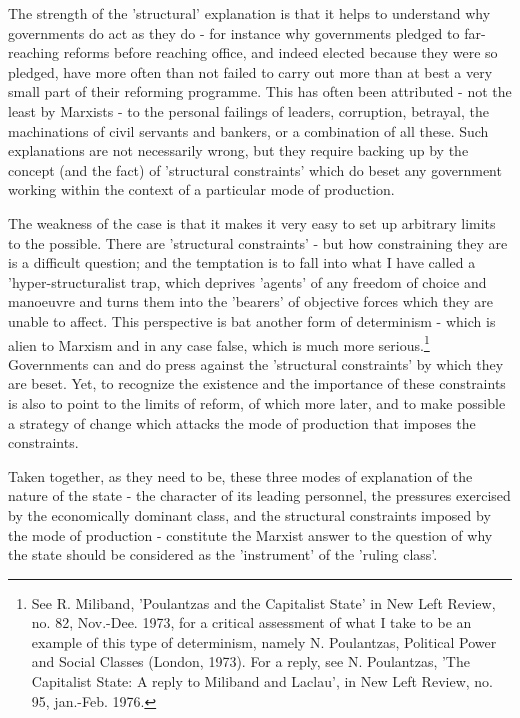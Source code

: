 The strength of the 'structural' explanation is that it helps to understand why governments do act as they do - for instance why governments pledged to far-reaching reforms before reaching office, and indeed elected because they were so pledged, have more often than not failed to carry out more than at best a very small part of their reforming programme. This has often been attributed - not the least by Marxists - to the personal failings of leaders, corruption, betrayal, the machinations of civil servants and bankers, or a combination of all these. Such explanations are not necessarily wrong, but they require backing up by the concept (and the fact) of 'structural constraints' which do beset any government working within the context of a particular mode of production.

The weakness of the case is that it makes it very easy to set up arbitrary limits to the possible. There are 'structural constraints' - but how constraining they are is a difficult question; and the temptation is to fall into what I have called a 'hyper\hyp{}structuralist trap, which deprives 'agents' of any freedom of choice and manoeuvre and turns them into the 'bearers' of objective forces which they are unable to affect. This perspective is bat another form of determinism - which is alien to Marxism and in any case false, which is much more serious.\footnote{See R. Miliband, 'Poulantzas and the Capitalist State' in New Left Review, no. 82, Nov.-Dee. 1973, for a critical assessment of what I take to be an example of this type of determinism, namely N. Poulantzas, Political Power and Social Classes (London, 1973). For a reply, see N. Poulantzas, 'The Capitalist State: A reply to Miliband and Laclau', in New Left Review, no. 95, jan.-Feb. 1976.} Governments can and do press against the 'structural constraints' by which they are beset. Yet, to recognize the existence and the importance of these constraints is also to point to the limits of reform, of which more later, and to make possible a strategy of change which attacks the mode of production that imposes the constraints.

Taken together, as they need to be, these three modes of explanation of the nature of the state - the character of its leading personnel, the pressures exercised by the economically dominant class, and the structural constraints imposed by the mode of production - constitute the Marxist answer to the question of why the state should be considered as the 'instrument' of the 'ruling class'.

